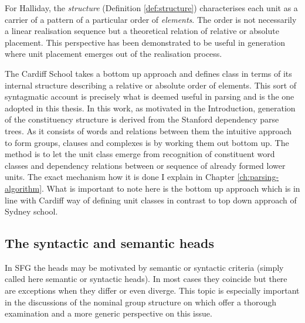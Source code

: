 For Halliday, the \textit{structure} (Definition \ref{def:structure}) characterises each unit as a carrier of a pattern of a particular order of \textit{elements}. The order is not necessarily a linear realisation sequence but a theoretical relation of relative or absolute placement. This perspective has been demonstrated to be useful in generation where unit placement emerges out of the realisation process.

The Cardiff School takes a bottom up approach and defines class in terms of its internal structure describing a relative or absolute order of elements. This sort of syntagmatic account is precisely what is deemed useful in parsing and is the one adopted in this thesis. 
In this work, as motivated in the Introduction, generation of the constituency structure is derived from the Stanford dependency parse trees. As it consists of words and relations between them the intuitive approach to form groups, clauses and complexes is by working them out bottom up. 
The method is to let the unit class emerge from recognition of constituent word classes and dependency relations between or sequence of already formed lower units. The exact mechanism how it is done I explain in Chapter \ref{ch:parsing-algorithm}. What is important to note here is the bottom up approach which is in line with Cardiff way of defining unit classes in contrast to top down approach of Sydney school.


\subsection{The syntactic and semantic heads}
In SFG the heads may be motivated by semantic or syntactic criteria (simply called here semantic or syntactic heads). In most cases they coincide but there are exceptions when they differ or even diverge. This topic is especially important in the discussions of the nominal group structure on which \citet{Halliday2013} offer a thorough examination and \citet{Fawcett2000} a more generic perspective on this issue.


